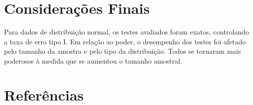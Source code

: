 \documentclass[a4paper,11pt]{article} %
\begin{document}




\section{Considerações Finais}

Para dados de distribuição normal, os testes avaliados foram exatos, controlando a taxa de erro tipo I. Em relação ao poder, o desempenho dos testes foi afetado pelo tamanho da amostra e pelo tipo da distribuição. Todos se tornaram mais poderosos à medida que se aumentou o tamanho amostral. 


\section*{Referências}
\end{document}
